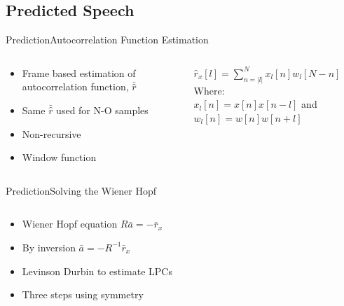 \subsection{Predicted Speech}
\begin{frame}{Prediction}{Autocorrelation Function Estimation}
	\begin{columns}
		\begin{column}{0.5\textwidth}
			\begin{itemize}
				\item Frame based estimation of autocorrelation function, $\bar{\hat{r}}$
				\item Same  $\bar{\hat{r}}$ used for N-O samples
				\item Non-recursive
				\item Window function
			\end{itemize}
		\end{column}
		\begin{column}{0.5\textwidth} 
			$\hat{r}_x[l] = \sum^{N}_{n=\left| l\right|} x_l[n]w_l[N-n]$\\
			\vspace{5mm}
			Where: \\
			$x_l[n]=x[n]x[n-l]$ and $w_l[n]=w[n]w[n+l]$
		\end{column}
	\end{columns}
\end{frame}

\begin{frame}{Prediction}{Solving the Wiener Hopf}
	\begin{columns}
		\begin{column}{0.4\textwidth}
			\begin{itemize}
				\item Wiener Hopf equation $R  \bar{a} = -\bar{r}_x$
				\item By inversion $\bar{a} = -R^{-1} \bar{r}_x$
				\item Levinson Durbin to estimate LPCs 
				\item Three steps using symmetry
			\end{itemize}
			
		\end{column}
		\begin{column}{0.6\textwidth} 
				\resizebox{1.0\columnwidth}{!}{	
				
			}	
		\end{column}
	\end{columns}
\end{frame}


